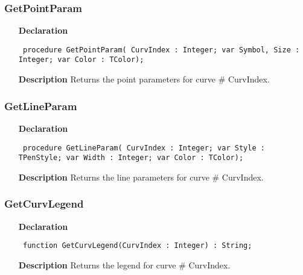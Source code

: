 \documentclass[12pt,a4paper,oneside]{report}
\newcommand{\declarationitem}[1]{\textbf{#1}}
\newcommand{\descriptiontitle}[1]{\textbf{#1}}
\newcommand{\code}[1]{\texttt{#1}}
\begin{document}
\subsubsection{GetPointParam}
\label{uwinplot-GetPointParam}
\begin{itemize}\item[\declarationitem{Declaration}\hfill]
	\begin{flushleft}
		\code{
			procedure GetPointParam( CurvIndex : Integer; var Symbol, Size : Integer; var Color : TColor);}
		
	\end{flushleft}
	
	\par
	\item[\descriptiontitle{Description}]
	Returns the point parameters for curve {\#} CurvIndex.
	
\end{itemize}
\subsubsection{GetLineParam}
\label{uwinplot-GetLineParam}
\begin{itemize}\item[\declarationitem{Declaration}\hfill]
	\begin{flushleft}
		\code{
			procedure GetLineParam( CurvIndex : Integer; var Style : TPenStyle; var Width : Integer; var Color : TColor);}
		
	\end{flushleft}
	
	\par
	\item[\descriptiontitle{Description}]
	Returns the line parameters for curve {\#} CurvIndex.
	
\end{itemize}
\subsubsection{GetCurvLegend}
\label{uwinplot-GetCurvLegend}
\begin{itemize}\item[\declarationitem{Declaration}\hfill]
	\begin{flushleft}
		\code{
			function GetCurvLegend(CurvIndex : Integer) : String;}
		
	\end{flushleft}
	
	\par
	\item[\descriptiontitle{Description}]
	Returns the legend for curve {\#} CurvIndex.
	
\end{itemize}
\end{document}
